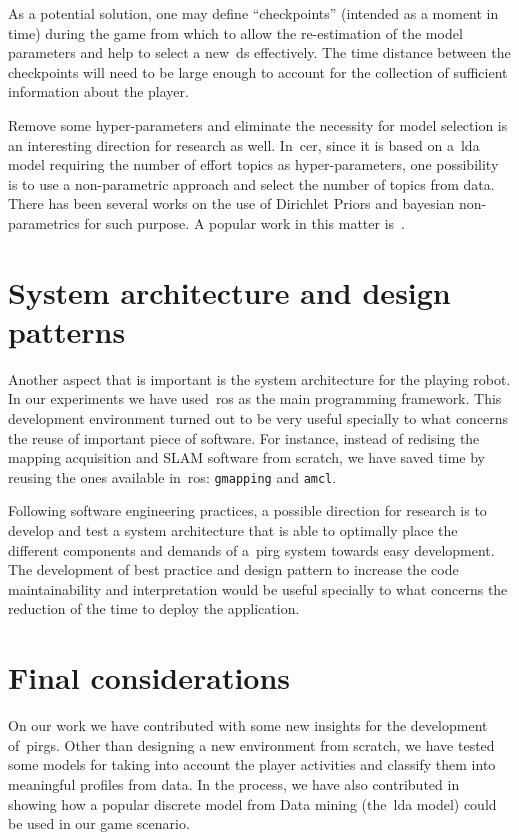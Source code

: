 As a potential solution, one may define ``checkpoints'' (intended as a moment in time) during the game from which to allow the re-estimation of the model parameters and help to select a new~\gls{ds} effectively. The time distance between the checkpoints will need to be large enough to account for the collection of sufficient information about the player.

Remove some hyper-parameters and eliminate the necessity for model selection is an interesting direction for research as well. In~\gls{cer}, since it is based on a~\gls{lda} model requiring the number of effort topics as hyper-parameters, one possibility is to use a non-parametric approach and select the number of topics from data. There has been several works on the use of Dirichlet Priors and bayesian non-parametrics for such purpose. A popular work in this matter is~\cite{teh_sharing_2005}. 

\section{System architecture and design patterns}
Another aspect that is important is the system architecture for the playing robot. In our experiments we have used~\gls{ros} as the main programming framework. This development environment turned out to be very useful specially to what concerns the reuse of important piece of software. For instance, instead of redising the  mapping acquisition and SLAM software from scratch, we have saved time by reusing the ones available in~\gls{ros}: \verb|gmapping| and \verb|amcl|. 

Following software engineering practices, a possible direction for research is to develop and test a system architecture that is able to optimally place the different components and demands of a~\gls{pirg} system towards easy development. The development of best practice and design pattern to increase the code maintainability and interpretation would be useful specially to what concerns the reduction of the time to deploy the application.

\section{Final considerations}
On our work we have contributed with some new insights for the development of~\gls{pirg}s. Other than designing a new environment from scratch, we have tested some models for taking into account the player activities and classify them into meaningful profiles from data. In the process, we have also contributed in showing how a popular discrete model from Data mining (the~\gls{lda} model) could be used in our game scenario. 

